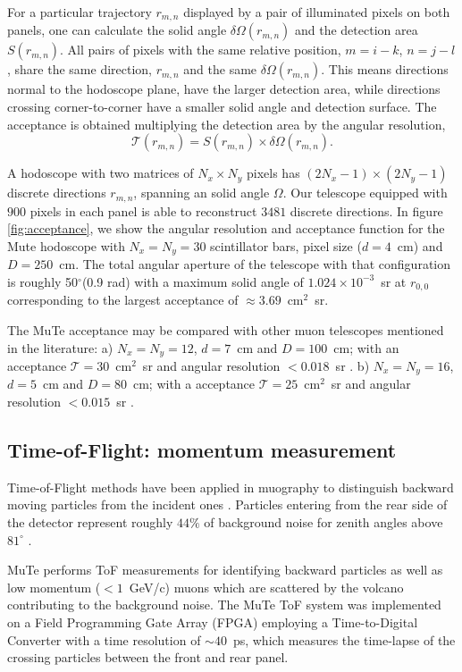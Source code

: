 \documentclass[letterpaper,11pt]{article}
\begin{document}
For a particular trajectory $r_{m,n}$ displayed by a pair of illuminated pixels on both panels, one can calculate the solid angle $\delta\Omega(r_{m,n})$ and the detection area $S(r_{m,n})$. All pairs of pixels with the same relative position, {$m=i-k$, $n=j-l$}, share the same direction, $r_{m,n}$ and the same $\delta\Omega(r_{m,n})$. This means directions normal to the hodoscope plane, have the larger detection area, while directions crossing corner-to-corner have a smaller solid angle and detection surface. The acceptance is obtained \cite{LesparreEtal2010} multiplying the detection area by the angular resolution,
\begin{equation}
\mathcal{T}(r_{m,n})=S(r_{m,n})\times \delta\Omega(r_{m,n}).
\end{equation}

A hodoscope with two matrices of $N_x\times N_y$ pixels has $(2N_x-1)\times(2N_y-1)$ discrete directions $r_{m,n}$, spanning an solid angle $\Omega$. Our telescope equipped with $900$ pixels in each panel is able to reconstruct $3481$ discrete directions. In figure \ref{fig:acceptance}, we show the angular resolution and acceptance function for the Mute hodoscope with $N_x=N_y=30$ scintillator bars, pixel size ($d=4$~cm) and $D=250$~cm. The total angular aperture of the telescope with that configuration is roughly 50$^{\circ}$(0.9 rad) with a maximum solid angle of $1.024\times 10^{-3}$~sr at $r_{0,0}$ corresponding to the largest acceptance of $\approx 3.69$~cm$^{2}$~sr.

The MuTe acceptance may be compared with other muon telescopes mentioned in the literature: a) $N_x=N_y=12$, $d=7$~cm and $D=100$~cm; with an acceptance $\mathcal{T}=30$~cm$^{2}$~sr and angular resolution $< 0.018$~sr \cite{UchidaTanakaTanaka2009space}. b) $N_x=N_y=16$, $d=5$~cm and $D=80$~cm; with a acceptance $\mathcal{T}=25$~cm$^{2}$~sr and angular resolution $< 0.015$~sr \cite{LesparreEtal2010}.

\subsection{Time-of-Flight: momentum measurement}
Time-of-Flight methods have been applied in muography to distinguish backward moving particles from the incident ones \cite{jourde2013experimental}. Particles entering from the rear side of the detector represent roughly $44\%$ of background noise for zenith angles above $81^{\circ}$ \cite{nishiyama2016monte}.

MuTe performs ToF measurements for identifying backward particles as well as low momentum ($< 1$~GeV/c) muons which are scattered by the volcano contributing to the background noise. The MuTe ToF system was implemented on a Field Programming Gate Array (FPGA) employing a Time-to-Digital Converter with a time resolution of $\sim 40$~ps, which measures the time-lapse of the crossing particles between the front and rear panel.
\end{document}
